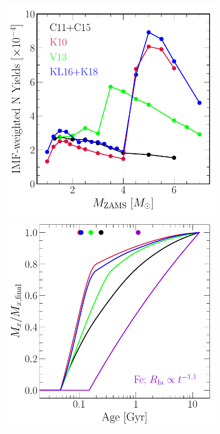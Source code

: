 \begin{figure}
\centering
\includegraphics[scale = 0.46]{agb_yield_models_imfweighted.pdf}
\includegraphics[scale = 0.45]{ssp_production_modelcomp.pdf}

\end{figure}
